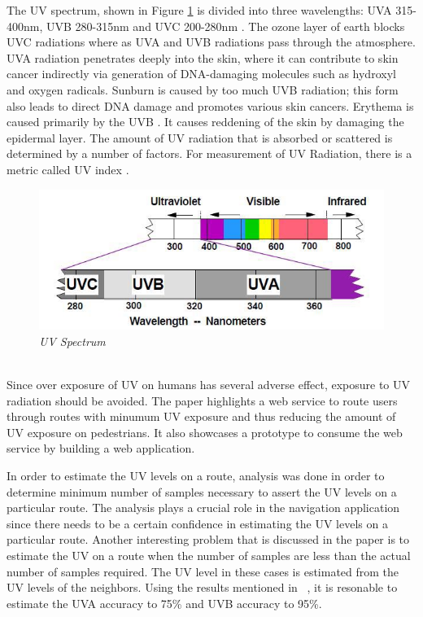 \documentclass[conference]{IEEETran}
\begin{document}
The UV spectrum, shown in Figure \ref{fig:uvSpectrum} is divided into three wavelengths: UVA 315-400nm, UVB 280-315nm and UVC 200-280nm \cite{dep4}. The ozone layer of earth blocks UVC radiations where as UVA and UVB radiations pass through the atmosphere. UVA radiation penetrates deeply into the skin, where it can contribute to skin cancer indirectly via generation of DNA-damaging molecules such as hydroxyl and oxygen radicals. Sunburn is caused by too much UVB radiation; this form also leads to direct DNA damage and promotes various skin cancers. Erythema is caused primarily by the UVB \cite{dep3}. It causes reddening of the skin by damaging the epidermal layer. The amount of UV radiation that is absorbed or scattered is determined by a number of factors. For measurement of UV Radiation, there is a metric called UV index \cite{dep5}. 
\begin{figure}
\begin{center}
\includegraphics[scale=0.45]{uvSpectrum.png}
\caption{\small \sl UV Spectrum\label{fig:uvSpectrum}}
\end{center}
\end{figure}
\\

Since over exposure of UV on humans has several adverse effect, exposure to UV radiation should be avoided. The paper highlights a web service to route users through routes with minumum UV exposure and thus reducing the amount of UV exposure on pedestrians. It also showcases a prototype to consume the web service by building a web application. 

In order to estimate the UV levels on a route, analysis was done in order to determine minimum number of samples necessary to assert the UV levels on a particular route. The analysis plays a crucial role in the navigation application since there needs to be a certain confidence in estimating the UV levels on a particular route. Another interesting problem that is discussed in the paper is to estimate the UV on a route when the number of samples are less than the actual number of samples required. The UV level in these cases is estimated from the UV levels of the neighbors. Using the results mentioned in ~\cite{uvguardian}, it is resonable to estimate the UVA accuracy to 75\% and UVB accuracy to 95\%. 
\end{document}
